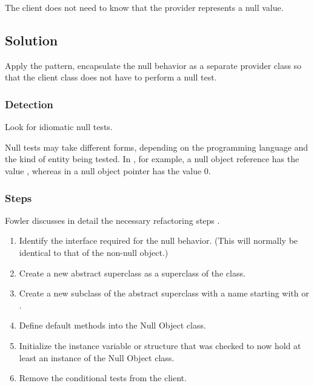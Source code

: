 \documentclass[a4paper,10pt,twoside]{book}
\begin{document}
\begin{bulletlist}
\item The client does not need to know that the provider represents a null value.
\end{bulletlist}

\subsection*{Solution}

Apply the  pattern, \ie encapsulate the null behavior as a separate provider class so that the client class does not have to perform a null test.

\subsubsection*{Detection }

Look for idiomatic null tests. 

Null tests may take different forms, depending on the programming language and the kind of entity being tested. In , for example, a null object reference has the value , whereas in  a null object pointer has the value 0.

\subsubsection*{Steps}

Fowler discusses in detail the necessary refactoring steps \cite{Fowl99a}.
\begin{enumerate}
  \item Identify the interface required for the null behavior. (This will normally be identical to that of the non-null object.)

  \item Create a new abstract superclass as a superclass of the  class.

  \item Create a new subclass of the abstract superclass with a name starting with  or .

  \item Define default methods into the Null Object class.

  \item Initialize the instance variable or structure that was checked to now hold at least an instance of the Null Object class.

  \item Remove the conditional tests from the client.
\end{enumerate}
\end{document}
